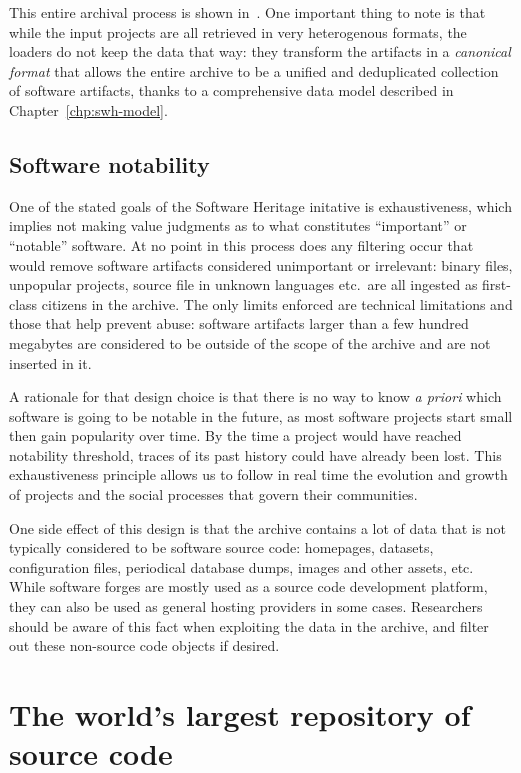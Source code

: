 This entire archival process is shown in~. One
important thing to note is that while the input projects are all retrieved in
very heterogenous formats, the loaders do not keep the data that way: they
transform the artifacts in a \emph{canonical format} that allows the entire
archive to be a unified and deduplicated collection of software artifacts,
thanks to a comprehensive data model described in Chapter~\ref{chp:swh-model}.

\subsection{Software notability}

One of the stated goals of the Software Heritage initative is exhaustiveness,
which implies not making value judgments as to what constitutes ``important''
or ``notable'' software. At no point in this process does any filtering occur
that would remove software artifacts considered unimportant or irrelevant:
binary files, unpopular projects, source file in unknown languages etc.\ are
all ingested as first-class citizens in the archive. The only limits enforced
are technical limitations and those that help prevent abuse: software artifacts
larger than a few hundred megabytes are considered to be outside of the scope
of the archive and are not inserted in it.

A rationale for that design choice is that there is no way to know \emph{a
priori} which software is going to be notable in the future, as most software
projects start small then gain popularity over time. By the time a project
would have reached notability threshold, traces of its past history could have
already been lost. This exhaustiveness principle allows us to follow in real
time the evolution and growth of projects and the social processes that govern
their communities.

One side effect of this design is that the archive contains a lot of data that
is not typically considered to be software source code: homepages, datasets,
configuration files, periodical database dumps, images and other assets, etc.
While software forges are mostly used as a source code development platform,
they can also be used as general hosting providers in some cases. Researchers
should be aware of this fact when exploiting the data in the archive, and
filter out these non-source code objects if desired.

\section{The world's largest repository of source code}

